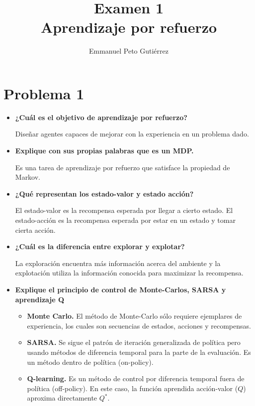 \documentclass{article}
\title{Examen 1\\Aprendizaje por refuerzo}
\author{Emmanuel Peto Gutiérrez}
\begin{document}
\maketitle

\section*{Problema 1}

\begin{itemize}
\item \textbf{¿Cuál es el objetivo de aprendizaje por refuerzo?}

Diseñar agentes capaces de mejorar con la experiencia en un problema dado.

\item \textbf{Explique con sus propias palabras que es un MDP.}

Es una tarea de aprendizaje por refuerzo que satisface la propiedad de Markov.

\item \textbf{¿Qué representan los estado-valor y estado acción?}

El estado-valor es la recompensa esperada por llegar a cierto estado. El estado-acción es la recompensa esperada por estar en un estado y tomar cierta acción.

\item \textbf{¿Cuál es la diferencia entre explorar y explotar?}

La exploración encuentra más información acerca del ambiente y la explotación utiliza la información conocida para maximizar la recompensa.

\item \textbf{Explique el principio de control de Monte-Carlos, SARSA y aprendizaje Q}

    \begin{itemize}
    \item \textbf{Monte Carlo.} El método de Monte-Carlo sólo requiere ejemplares de experiencia, los cuales son secuencias de estados, acciones y recompensas.
    \item \textbf{SARSA.} Se sigue el patrón de iteración generalizada de política pero usando métodos de diferencia temporal para la parte de la evaluación. Es un método dentro de política (on-policy).
    \item \textbf{Q-learning.} Es un método de control por diferencia temporal fuera de política (off-policy). En este caso, la función aprendida acción-valor ($Q$) aproxima directamente $Q^*$.
    \end{itemize}

\end{itemize}
\end{document}
